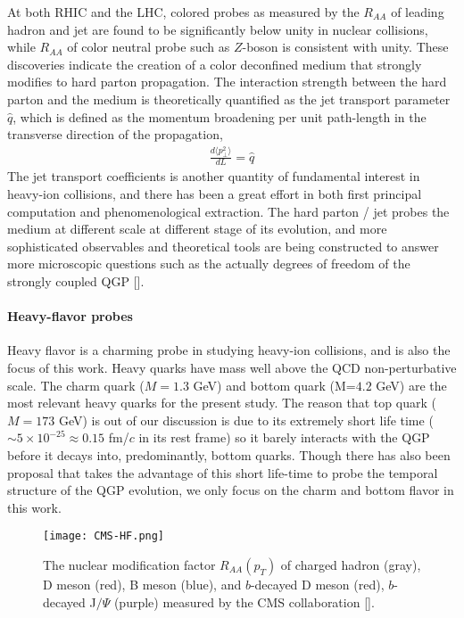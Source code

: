 At both RHIC and the LHC, colored probes as measured by the $R_{AA}$ of leading hadron and jet are found to be significantly below unity in nuclear collisions, while  $R_{AA}$ of color neutral probe such as $Z$-boson is consistent with unity.
These discoveries indicate the creation of a color deconfined medium that strongly modifies to hard parton propagation.
The interaction strength between the hard parton and the medium is theoretically quantified as the jet transport parameter $\hat{q}$, which is defined as the momentum broadening per unit path-length in the transverse direction of the propagation,
\begin{eqnarray}
\frac{d\langle p_\perp^2 \rangle}{dL} = \hat{q}
\end{eqnarray}
The jet transport coefficients is another quantity of fundamental interest  in heavy-ion collisions, and there has been a great effort in both first principal computation and phenomenological extraction.
The hard parton / jet probes the medium at different scale at different stage of its evolution, and more sophisticated observables and theoretical tools are being constructed to answer more microscopic questions such as the actually degrees of freedom of the strongly coupled QGP [].

\paragraph{Heavy-flavor probes}
Heavy flavor is a charming probe in studying heavy-ion collisions, and is also the focus of this work.
Heavy quarks have mass well above the QCD non-perturbative scale.
The charm quark ($M=1.3$ GeV) and bottom quark (M=$4.2$ GeV) are the most relevant heavy quarks for the present study.
The reason that top quark ($M = 173$ GeV) is out of our discussion is due to its extremely short life time ($\sim 5\times 10^{-25} \approx 0.15$  fm/$c$ in its rest frame) so it barely interacts with the QGP before it decays into, predominantly, bottom quarks.
Though there has also been proposal that takes the advantage of this short life-time to probe the temporal structure of the QGP evolution, we only focus on the charm and bottom flavor in this work.

\begin{figure}
\centering
\texttt{[image: CMS-HF.png]}
\caption{The nuclear modification factor $R_{AA}(p_T)$ of charged hadron (gray), D meson (red), B meson (blue), and $b$-decayed D meson (red), $b$-decayed J$/\Psi$ (purple) measured by the CMS collaboration [].}
\label{fig:intro:Raa}
\end{figure}

